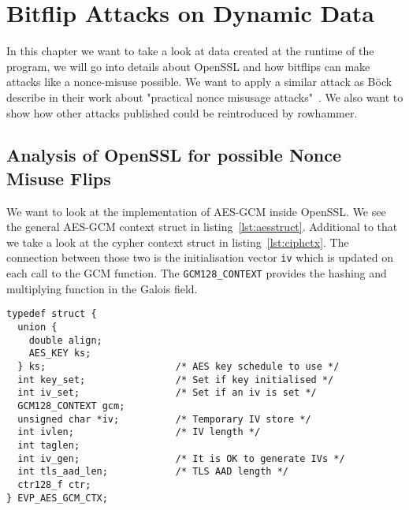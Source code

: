 \chapter{Bitflip Attacks on Dynamic Data}\label{sec:automate}

In this chapter we want to take a look at data created at the runtime of the
program, we will go into details about OpenSSL and how bitflips can make attacks
like a nonce-misuse possible. We want to apply a similar attack as Böck~\etal
describe in their work about "practical nonce misusage
attacks"~\cite{gcmnonceattack}. We also want to show how other attacks published
could be reintroduced by rowhammer.

\section{Analysis of OpenSSL for possible Nonce Misuse Flips}

We want to look at the implementation of AES-GCM inside OpenSSL. We see the
general AES-GCM context struct in listing~\ref{lst:aesstruct}. Additional to
that we take a look at the cypher context struct in listing~\ref{lst:ciphctx}.
The connection between those two is the initialisation vector \texttt{iv} which
is updated on each call to the GCM function. The \texttt{GCM128\_CONTEXT}
provides the hashing and multiplying function in the Galois field.

\begin{minipage}{\linewidth}
\begin{lstlisting}[style=CStyle,
                   caption={Struct used by OpenSSL to describe the AES-GCM
context. The IV used is stored in the memory pointed to by \texttt{iv}. Source
is taken from OpenSSL version $1.1.0g$},
                   label={lst:aesstruct}]
typedef struct {
  union {
    double align;
    AES_KEY ks;
  } ks;                       /* AES key schedule to use */
  int key_set;                /* Set if key initialised */
  int iv_set;                 /* Set if an iv is set */
  GCM128_CONTEXT gcm;
  unsigned char *iv;          /* Temporary IV store */
  int ivlen;                  /* IV length */
  int taglen;
  int iv_gen;                 /* It is OK to generate IVs */
  int tls_aad_len;            /* TLS AAD length */
  ctr128_f ctr;
} EVP_AES_GCM_CTX;
\end{lstlisting}
\end{minipage}

